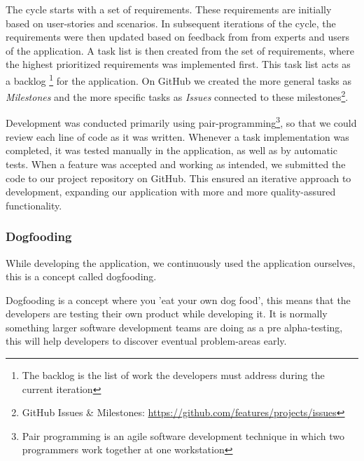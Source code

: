 The cycle starts with a set of requirements. These requirements are initially based on user-stories and scenarios. In subsequent iterations of the cycle, the requirements were then updated based on feedback from from experts and users of the application. A task list is then created from the set of requirements, where the highest prioritized requirements was implemented first. This task list acts as a backlog 
\footnote{The backlog is the list of work the developers must address during the current iteration} for the application. On GitHub we created the more general tasks as \emph{Milestones} and the more specific tasks as \emph{Issues} connected to these milestones\footnote{GitHub Issues \& Milestones: \url{https://github.com/features/projects/issues}}.

Development was conducted primarily using pair-programming\footnote{Pair programming is an agile software development technique in which two programmers work together at one workstation}, so that we could review each line of code as it was written. Whenever a task implementation was completed, it was tested manually in the application, as well as by automatic tests. When a feature was accepted and working as intended, we submitted the code to our project repository on GitHub.
This ensured an iterative approach to development, expanding our application with more and more quality-assured functionality. 

\subsubsection*{Dogfooding}
\label{dogfooding}
While developing the application, we continuously used the application ourselves, this is a concept called dogfooding.

Dogfooding is a concept where you 'eat your own dog food', this means that the developers are testing their own product while developing it\citep{dogfooding}. It is normally something larger software development teams are doing as a pre alpha-testing, this will help developers to discover eventual problem-areas early.
\clearpage

